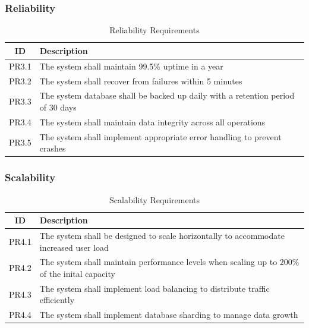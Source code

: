 \documentclass{article}
\begin{document}
\subsubsection{Reliability}
\begin{table}[h!]
    \centering
    \begin{tabular}{|c|p{10cm}|}
    \hline
    \textbf{ID} & \textbf{Description} \\
    \hline
    PR3.1 & The system shall maintain 99.5$\%$ uptime in a year\\
    PR3.2 & The system shall recover from failures within 5 minutes \\
    PR3.3 & The system database shall be backed up daily with a retention period of 30 days \\
    PR3.4 & The system shall maintain data integrity across all operations \\
    PR3.5 & The system shall implement appropriate error handling to prevent crashes \\
    \hline
    \end{tabular}
    \caption{Reliability Requirements}
    \label{tab: reliability}
\end{table}

\clearpage
\subsubsection{Scalability}
\begin{table}[h!]
\centering
\begin{tabular}{|c|p{10cm}|}
\hline
\textbf{ID} & \textbf{Description} \\
\hline
PR4.1 & The system shall be designed to scale horizontally to accommodate increased user load \\
PR4.2 & The system shall maintain performance levels when scaling up to 200$\%$ of the inital capacity\\
PR4.3 & The system shall implement load balancing to distribute traffic efficiently \\
PR4.4 & The system shall implement database sharding to manage data growth \\
\hline
\end{tabular}
\caption{Scalability Requirements}
\label{tab: scalability}
\end{table}
\end{document}
